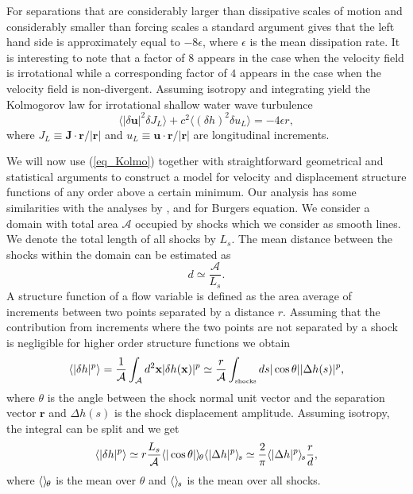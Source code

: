 \documentclass{jfm}
\newcommand{\uu}{\textbf{u}}
\newcommand{\xx}{\textbf{x}}
\newcommand{\JJ}{\textbf{J}}
\newcommand{\rr}{\textbf{r}}
\newcommand{\meane}[1]{\langle #1 \rangle}
\newcommand{\meant}[1]{{\langle #1 \rangle_{\hspace{-0.4mm}\theta}}}
\newcommand{\means}[1]{{\langle #1 \rangle_{\hspace{-0.4mm}s}}}
\newcommand{\shocks}{ {\mbox{\tiny shocks}} }
\newcommand{\mA}{\mathcal{A}}
\begin{document}
For separations that are considerably larger than dissipative scales of motion and considerably smaller than forcing scales a standard argument \cite[see for example][]{Frisch} gives that the left hand side is approximately equal to $ -8 \epsilon $, where $ \epsilon $ is the mean dissipation rate. It is interesting to note that a factor of $ 8 $ appears in the case when the velocity field is irrotational while a corresponding factor of $ 4 $ appears in the case when the velocity field is non-divergent. 
Assuming isotropy and integrating yield the Kolmogorov law for
irrotational shallow water wave  turbulence
\begin{equation}
\meane{ |\delta \uu|^2 \delta J_L } 
+ c^2\meane{ (\delta h)^2 \delta u_L } = -4 \epsilon r, \label{eq_Kolmo}
\end{equation}
where $J_L \equiv
\JJ\cdot\rr / |\rr|$ and $u_L \equiv \uu\cdot\rr / |\rr|$ are
longitudinal increments.




We will now use (\ref{eq_Kolmo}) together with straightforward geometrical and statistical arguments to construct a model for velocity and displacement structure functions of any order above a certain minimum.
Our analysis has some similarities with the analyses by \cite{BouchaudMezardParisi1995}, \cite{WeinanKhaninMazelSinai1997} and \cite{Weinan}
for Burgers equation. 
We consider a domain with total area  $ {\mA} $ occupied by shocks which we 
consider as smooth lines. We denote the total length of all shocks by $ L_s $.  The mean distance between the shocks within the domain can be estimated as
\begin{equation}
d \simeq \frac{\mA} {L_s} .
\end{equation} 
A structure function of a flow variable is defined as the area average of increments  between two points separated by a distance $ r $.
Assuming that the contribution from increments where the two points are not separated by a shock is negligible for higher order structure functions we obtain
\begin{eqnarray}
\meane{|\delta h|^p} 
=  \frac{1}{\mA} \int_{\mA}  d^2\xx |\delta h(\xx)|^p 
 \simeq  \frac{r}{\mA} \int_\shocks ds |\cos\theta| |\Delta h (s)|^p,
\end{eqnarray}
where $\theta$ is the angle between the shock normal unit vector and the separation
vector $\rr$ %
and $\Delta h (s)$ is the shock displacement amplitude.
%
Assuming isotropy, the integral can be split and we get
\begin{equation} \label{StepH}
\meane{|\delta h|^p} 
\simeq 
r \frac{L_s}{\mA} \meant{|\cos\theta|} \means{|\Delta h |^p}
\simeq  \frac{2}{\pi} \means{|\Delta h |^p} \frac{r}{d} ,
\end{equation}
where $\meant{}$ is the mean over $\theta$
and $\means{}$ is the mean over all shocks.
\end{document}
